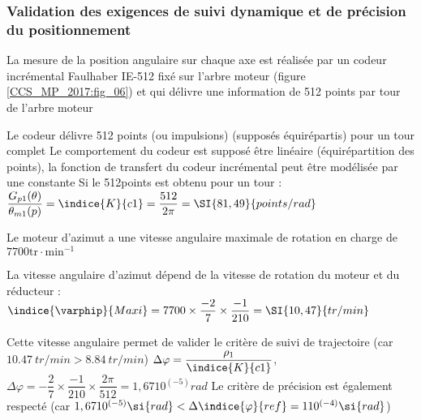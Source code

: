 \subsubsection{ Validation des exigences de suivi dynamique et de précision du positionnement}

\ifprof
\else
La mesure de la position angulaire sur chaque axe est réalisée par un codeur incrémental Faulhaber IE-512 fixé sur l'arbre moteur (figure \ref{CCS_MP_2017:fig_06}) et qui délivre une information de 512 points par tour de l'arbre moteur\\
\fi

\ifprof
\begin{corrige}
Le codeur délivre 512 points (ou impulsions) (supposés équirépartis) pour un tour complet Le comportement du codeur est supposé être linéaire (équirépartition des points), la fonction de transfert du codeur incrémental peut être modélisée par une constante Si le 512\ieme  points est obtenu pour un tour :
$\dfrac{G_{p1}  (\theta)}{\theta_{m1}  (p)}=\indice{K}{c1} =\dfrac{512}{2\pi} =\SI{81,49}{points/rad}$ 

\end{corrige}
\else
\fi

Le moteur d'azimut a une vitesse angulaire maximale de rotation en charge de $7700 \mathrm{tr} \cdot \mathrm{min}^{-1}$\\

\ifprof
\begin{corrige}
La vitesse angulaire d’azimut dépend de la vitesse de rotation du moteur et du réducteur : 
$\indice{\varphip}{Maxi} = 7 700 \times \dfrac{-2}{7}\times \dfrac{-1}{210} =\SI{10,47}{tr/min}$

Cette vitesse angulaire permet de valider le critère de suivi de trajectoire (car $\SI{10,47}{tr/min}>\SI{8,84}{tr/min}$)
$\Delta\varphi= \dfrac{\rho_1}{\indice{K}{c1}}$, $\Delta\varphi= -\dfrac{2}{7}\times \dfrac{-1}{210}\times\dfrac{2  \pi}{512}=1,6710^{(-5)}\si{rad}$  
Le critère de précision est également respecté (car $1,6710^{(-5)}\si{rad} <\Delta\indice{\varphi}{ref}=110^{(-4)} \si{rad}$)

\end{corrige}
\else
\fi


